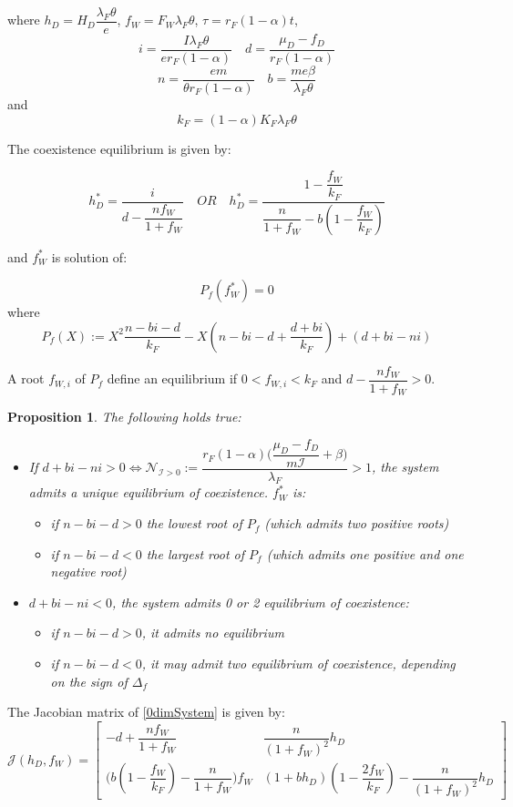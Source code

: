 \documentclass{article}
\newcommand{\lfw}{\lambda_{F}}
\newcommand{\lfw}{\lambda_{F}}
\newcommand{\cI}{\mathcal{I}}
\newtheorem{prop}{Proposition}
\begin{document}
where $h_D = H_D \dfrac{\lfw \theta}{e}$, $f_W = F_W \lfw \theta$, $\tau = r_F(1-\alpha) t$, 
$$i = \dfrac{I \lfw \theta}{e r_F(1-\alpha)} \quad d = \dfrac{\mu_D - f_D}{r_F(1-\alpha)}$$
$$n = \dfrac{e m }{\theta r_F(1-\alpha)} \quad b = \dfrac{me \beta}{\lfw \theta}$$ and $$k_F = (1-\alpha) K_F \lfw \theta$$

The coexistence equilibrium is given by:

$$h_D^* = \dfrac{i}{d - \dfrac{n f_W}{1 + f_W}} \quad OR \quad h_D^* = \dfrac{1 - \dfrac{f_W}{k_F}}{\dfrac{n }{1 + f_W} - b (1 - \dfrac{f_W}{k_F})}$$

and $f_W^*$ is solution of:

$$P_f(f_W^*) = 0$$
where
\begin{equation}
P_f(X) := X^2 \dfrac{n - bi - d}{k_F} - X (n - bi - d + \dfrac{d + bi}{k_F}) + (d + bi - ni)
\end{equation}

A root $f_{W,i}$ of $P_f$ define an equilibrium if $0 < f_{W,i} < k_F$ and $d - \dfrac{n f_W}{1 + f_W} > 0$.

\begin{prop} The following holds true:
\begin{itemize}
\item If $d + bi - ni > 0 \Leftrightarrow \mathcal{N}_{\cI > 0}:= \dfrac{r_F(1-\alpha)\Big({\dfrac{\mu_D - f_D}{m\cI}+\beta\Big)}}{\lfw}  > 1$, the system admits a unique equilibrium of coexistence. $f_W^*$ is:
\begin{itemize}
\item if $n - bi - d > 0$ the lowest root of $P_f$ (which admits two positive roots)
\item if $n - bi - d < 0$ the largest root of $P_f$ (which admits one positive and one negative root)
\end{itemize}
\item $d + bi - ni  < 0$, the system admits 0 or 2 equilibrium of coexistence:
\begin{itemize}
\item if $n - bi - d > 0$, it admits no equilibrium
\item if $n - bi - d < 0$, it may admit two equilibrium of coexistence, depending on the sign of $\Delta_f$
\end{itemize}
\end{itemize}

\end{prop}


The Jacobian matrix of \eqref{0dimSystem} is given by:
\begin{equation}
\mathcal{J}(h_D, f_W) = \begin{bmatrix}
- d + \dfrac{nf_W}{1+f_W} & \dfrac{n}{(1 + f_W)^2}h_D \\
\Big(b (1 - \dfrac{f_W}{k_F}) - \dfrac{n}{1+f_W}\Big) f_W & (1+bh_D)(1 - \dfrac{2f_W}{k_F}) - \dfrac{n}{(1 + f_W)^2}h_D
\end{bmatrix}
\end{equation} 
\end{document}
